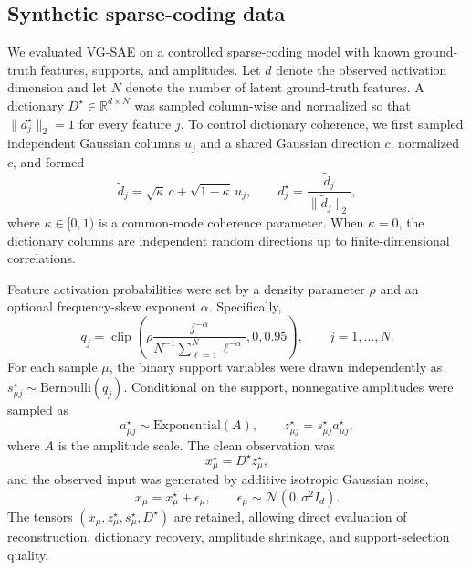 \subsection{Synthetic sparse-coding data}
\label{sec:synthetic_sparse_coding_data}

We evaluated VG-SAE on a controlled sparse-coding model with known ground-truth
features, supports, and amplitudes. Let $d$ denote the observed activation
dimension and let $N$ denote the number of latent ground-truth features. A
dictionary $D^\star \in \mathbb{R}^{d \times N}$ was sampled column-wise and
normalized so that $\|d^\star_j\|_2 = 1$ for every feature $j$. To control
dictionary coherence, we first sampled independent Gaussian columns $u_j$ and a
shared Gaussian direction $c$, normalized $c$, and formed
\begin{equation}
    \tilde d_j
    =
    \sqrt{\kappa}\,c + \sqrt{1-\kappa}\,u_j ,
    \qquad
    d^\star_j = \frac{\tilde d_j}{\|\tilde d_j\|_2},
\end{equation}
where $\kappa \in [0,1)$ is a common-mode coherence parameter. When
$\kappa=0$, the dictionary columns are independent random directions up to
finite-dimensional correlations.

Feature activation probabilities were set by a density parameter $\rho$ and an
optional frequency-skew exponent $\alpha$. Specifically,
\begin{equation}
    q_j
    =
    \operatorname{clip}\left(
        \rho \frac{j^{-\alpha}}{N^{-1}\sum_{\ell=1}^{N}\ell^{-\alpha}},
        0,
        0.95
    \right),
    \qquad j=1,\ldots,N .
\end{equation}
For each sample $\mu$, the binary support variables were drawn independently as
$s^\star_{\mu j} \sim \mathrm{Bernoulli}(q_j)$. Conditional on the support,
nonnegative amplitudes were sampled as
\begin{equation}
    a^\star_{\mu j} \sim \mathrm{Exponential}(A),
    \qquad
    z^\star_{\mu j}=s^\star_{\mu j}a^\star_{\mu j},
\end{equation}
where $A$ is the amplitude scale. The clean observation was
\begin{equation}
    x^\star_\mu = D^\star z^\star_\mu ,
\end{equation}
and the observed input was generated by additive isotropic Gaussian noise,
\begin{equation}
    x_\mu = x^\star_\mu + \epsilon_\mu,
    \qquad
    \epsilon_\mu \sim \mathcal{N}(0,\sigma^2 I_d).
\end{equation}
The tensors $(x_\mu, z^\star_\mu, s^\star_\mu, D^\star)$ are retained, allowing
direct evaluation of reconstruction, dictionary recovery, amplitude shrinkage,
and support-selection quality.

